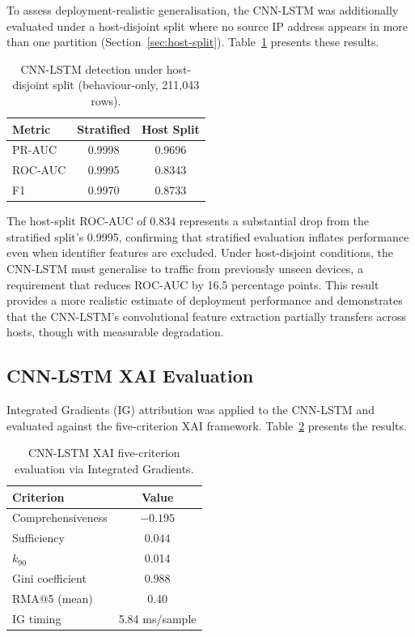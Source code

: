 \documentclass[12pt,a4paper]{report}
\begin{document}
To assess deployment-realistic generalisation, the CNN-LSTM was additionally evaluated under a host-disjoint split where no source IP address appears in more than one partition (Section~\ref{sec:host-split}). Table~\ref{tab:cnnlstm-host} presents these results.

\begin{table}[H]
\centering
\caption{CNN-LSTM detection under host-disjoint split (behaviour-only, 211,043 rows).}
\label{tab:cnnlstm-host}
\begin{tabular}{lcc}
\toprule
\textbf{Metric} & \textbf{Stratified} & \textbf{Host Split} \\
\midrule
PR-AUC & 0.9998 & 0.9696 \\
ROC-AUC & 0.9995 & 0.8343 \\
F1 & 0.9970 & 0.8733 \\
\bottomrule
\end{tabular}
\end{table}

The host-split ROC-AUC of 0.834 represents a substantial drop from the stratified split's 0.9995, confirming that stratified evaluation inflates performance even when identifier features are excluded. Under host-disjoint conditions, the CNN-LSTM must generalise to traffic from previously unseen devices, a requirement that reduces ROC-AUC by 16.5 percentage points. This result provides a more realistic estimate of deployment performance and demonstrates that the CNN-LSTM's convolutional feature extraction partially transfers across hosts, though with measurable degradation.

\subsection{CNN-LSTM XAI Evaluation}
\label{sec:cnnlstm-xai}

Integrated Gradients (IG) attribution was applied to the CNN-LSTM and evaluated against the five-criterion XAI framework. Table~\ref{tab:cnnlstm-xai} presents the results.

\begin{table}[H]
\centering
\caption{CNN-LSTM XAI five-criterion evaluation via Integrated Gradients.}
\label{tab:cnnlstm-xai}
\begin{tabular}{lc}
\toprule
\textbf{Criterion} & \textbf{Value} \\
\midrule
Comprehensiveness & $-0.195$ \\
Sufficiency & $0.044$ \\
$k_{90}$ & 0.014 \\
Gini coefficient & 0.988 \\
RMA@5 (mean) & 0.40 \\
IG timing & 5.84 ms/sample \\
\bottomrule
\end{tabular}
\end{table}
\end{document}
